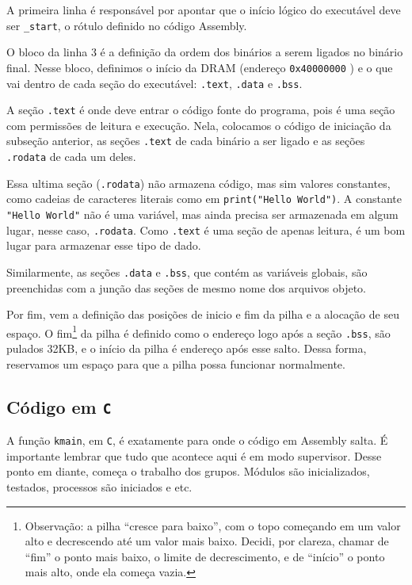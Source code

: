 A primeira linha é responsável por apontar que o início lógico do executável deve ser \verb|_start|, o rótulo definido no código Assembly.

O bloco da linha 3 é a definição da ordem dos binários a serem ligados no binário final. Nesse bloco, definimos o início da DRAM (endereço \verb|0x40000000| \cite{qemu:virtmachine}) e o que vai dentro de cada seção do executável: \verb|.text|, \verb|.data| e \verb|.bss|.

A seção \verb|.text| é onde deve entrar o código fonte do programa, pois é uma seção com permissões de leitura e execução. Nela, colocamos o código de iniciação da subseção anterior, as seções \verb|.text| de cada binário a ser ligado e as seções \verb|.rodata| de cada um deles.

Essa ultima seção (\verb|.rodata|) não armazena código, mas sim valores constantes, como cadeias de caracteres literais como em \texttt{print("Hello World")}. A constante \texttt{"Hello World"} não é uma variável, mas ainda precisa ser armazenada em algum lugar, nesse caso, \verb|.rodata|. Como \verb|.text| é uma seção de apenas leitura, é um bom lugar para armazenar esse tipo de dado.

Similarmente, as seções \verb|.data| e \verb|.bss|, que contém as variáveis globais, são preenchidas com a junção das seções de mesmo nome dos arquivos objeto.

Por fim, vem a definição das posições de inicio e fim da pilha e a alocação de seu espaço. O fim\footnote{Observação: a pilha ``cresce para baixo'', com o topo começando em um valor alto e decrescendo até um valor mais baixo. Decidi, por clareza, chamar de ``fim'' o ponto mais baixo, o limite de decrescimento, e de ``início'' o ponto mais alto, onde ela começa vazia.} da pilha é definido como o endereço logo após a seção \verb|.bss|, são pulados 32KB, e o início da pilha é endereço após esse salto. Dessa forma, reservamos um espaço para que a pilha possa funcionar normalmente.

\subsection{Código em \texttt{C}}

A função \texttt{kmain}, em \texttt{C}, é exatamente para onde o código em Assembly salta. É importante lembrar que tudo que acontece aqui é em modo supervisor. Desse ponto em diante, começa o trabalho dos grupos. Módulos são inicializados, testados, processos são iniciados e etc.

